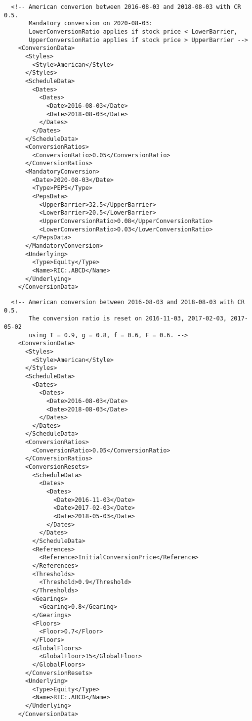 \begin{listing}[H]
\begin{verbatim}
  <!-- American converion between 2016-08-03 and 2018-08-03 with CR 0.5.
       Mandatory conversion on 2020-08-03:
       LowerConversionRatio applies if stock price < LowerBarrier,
       UpperConversionRatio applies if stock price > UpperBarrier -->
    <ConversionData>
      <Styles>
        <Style>American</Style>
      </Styles>
      <ScheduleData>
        <Dates>
          <Dates>
            <Date>2016-08-03</Date>
            <Date>2018-08-03</Date>
          </Dates>
        </Dates>
      </ScheduleData>
      <ConversionRatios>
        <ConversionRatio>0.05</ConversionRatio>
      </ConversionRatios>
      <MandatoryConversion>
        <Date>2020-08-03</Date>
        <Type>PEPS</Type>
        <PepsData>
          <UpperBarrier>32.5</UpperBarrier>
          <LowerBarrier>20.5</LowerBarrier>
          <UpperConversionRatio>0.08</UpperConversionRatio>
          <LowerConversionRatio>0.03</LowerConversionRatio>
        </PepsData>
      </MandatoryConversion>
      <Underlying>
        <Type>Equity</Type>
        <Name>RIC:.ABCD</Name>
      </Underlying>
    </ConversionData>
\end{verbatim}
\caption{Convertible bond conversion example 4}
\label{lst:convertiblebonddata_conversion_4}
\end{listing}

\begin{listing}[H]
\begin{verbatim}
  <!-- American conversion between 2016-08-03 and 2018-08-03 with CR 0.5.
       The conversion ratio is reset on 2016-11-03, 2017-02-03, 2017-05-02
       using T = 0.9, g = 0.8, f = 0.6, F = 0.6. -->
    <ConversionData>
      <Styles>
        <Style>American</Style>
      </Styles>
      <ScheduleData>
        <Dates>
          <Dates>
            <Date>2016-08-03</Date>
            <Date>2018-08-03</Date>
          </Dates>
        </Dates>
      </ScheduleData>
      <ConversionRatios>
        <ConversionRatio>0.05</ConversionRatio>
      </ConversionRatios>
      <ConversionResets>
        <ScheduleData>
          <Dates>
            <Dates>
              <Date>2016-11-03</Date>
              <Date>2017-02-03</Date>
              <Date>2018-05-03</Date>
            </Dates>
          </Dates>
        </ScheduleData>
        <References>
          <Reference>InitialConversionPrice</Reference>
        </References>
        <Thresholds>
          <Threshold>0.9</Threshold>
        </Thresholds>
        <Gearings>
          <Gearing>0.8</Gearing>
        </Gearings>
        <Floors>
          <Floor>0.7</Floor>
        </Floors>
        <GlobalFloors>
          <GlobalFloor>15</GlobalFloor>
        </GlobalFloors>
      </ConversionResets>
      <Underlying>
        <Type>Equity</Type>
        <Name>RIC:.ABCD</Name>
      </Underlying>
    </ConversionData>
\end{verbatim}
\caption{Convertible bond conversion example 5}
\label{lst:convertiblebonddata_conversion_5}
\end{listing}

